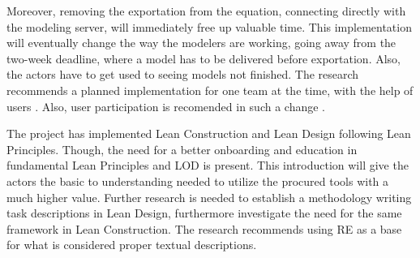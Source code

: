 Moreover, removing the exportation from the equation, connecting directly with the modeling server, will immediately free up valuable time. This implementation will eventually change the way the modelers are working, going away from the two-week deadline, where a model has to be delivered before exportation. Also, the actors have to get used to seeing models not finished. The research recommends a planned implementation for one team at the time, with the help of users \cite{bratteteig2016unpacking}. Also, user participation is recomended in such a change \cite{hatling1998social, ehn1993scandinavian}.

The project has implemented Lean Construction and Lean Design following Lean Principles. Though, the need for a better onboarding and education in fundamental Lean Principles and LOD is present. This introduction will give the actors the basic to understanding needed to utilize the procured tools with a much higher value. Further research is needed to establish a methodology writing task descriptions in Lean Design, furthermore investigate the need for the same framework in Lean Construction. The research recommends using RE as a base for what is considered proper textual descriptions. 

\cleardoublepage